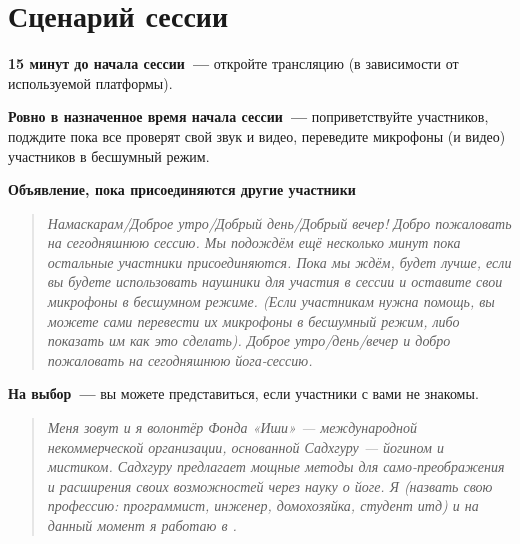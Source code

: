 \newpage
\section*{Сценарий сессии}
\label{sec:plan}

\textbf{15 минут до начала сессии~---} откройте трансляцию (в зависимости от используемой платформы). 

\textbf{Ровно в назначенное время начала сессии~---} поприветствуйте участников, подждите пока все проверят свой звук и видео, переведите микрофоны (и видео) участников в бесшумный режим.

\textbf{Объявление, пока присоединяются другие участники}
\begin{quote}\emph{
Намаскарам/Доброе утро/Добрый день/Добрый вечер!
Добро пожаловать на сегодняшнюю сессию. Мы подождём ещё несколько
минут пока остальные участники присоединяются. Пока мы ждём, будет
лучше, если вы будете использовать наушники для участия в сессии и
оставите свои микрофоны в бесшумном режиме. (Если участникам нужна
помощь, вы можете сами перевести их микрофоны в бесшумный режим,
либо показать им как это сделать).
Доброе утро/день/вечер и добро пожаловать на сегодняшнюю
йога-сессию.
}\end{quote}

\textbf{На выбор~---} вы можете представиться, если участники с вами не знакомы.
\begin{quote}\emph{
Меня зовут \underline{\qquad} и я волонтёр Фонда «Иши» — международной
некоммерческой организации, основанной Садхгуру — йогином и
мистиком. Садхгуру предлагает мощные методы для само-преображения и
расширения своих возможностей через науку о йоге.
Я (назвать свою профессию: программист, инженер, домохозяйка, студент
итд) и на данный момент я работаю в \underline{\qquad}.
}\end{quote}

